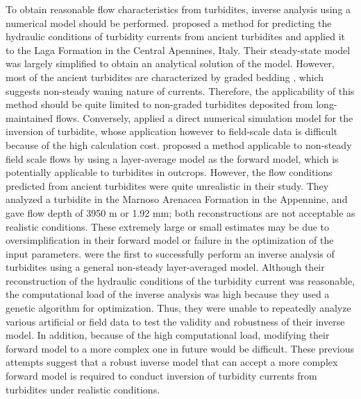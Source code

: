 To obtain reasonable flow characteristics from turbidites, inverse analysis using a numerical model should be performed. \citet{Falcini2009} proposed a method for predicting the hydraulic conditions of turbidity currents from ancient turbidites and applied it to the Laga Formation in the Central Apennines, Italy. Their steady-state model was largely simplified to obtain an analytical solution of the model. However, most of the ancient turbidites are characterized by graded bedding \citep{Bouma1962}, which suggests non-steady waning nature of currents. Therefore, the applicability of this method should be quite limited to non-graded turbidites deposited from long-maintained flows. Conversely, \citet{lesshafft2011towards} applied a direct numerical simulation model for the inversion of turbidite, whose application however to field-scale data is difficult because of the high calculation cost. \citet{Parkinson2017} proposed a method applicable to non-steady field scale flows by using a layer-average model as the forward model, which is potentially applicable to turbidites in outcrops. However, the flow conditions predicted from ancient turbidites were quite unrealistic in their study. They analyzed a turbidite in the Marnoso Arenacea Formation in the Appennine, and gave flow depth of  3950 m or 1.92 mm; both reconstructions are not acceptable as realistic conditions. These extremely large or small estimates may be due to oversimplification in their forward model or failure in the optimization of the input parameters. \citet{Nakao2017} were the first to successfully perform an inverse analysis of turbidites using a general non-steady layer-averaged model. Although their reconstruction of the hydraulic conditions of the turbidity current was reasonable, the computational load of the inverse analysis was high because they used a genetic algorithm for optimization. Thus, they were unable to repeatedly analyze various artificial or field data to test the validity and robustness of their inverse model. In addition, because of the high computational load, modifying their forward model to a more complex one in future would be difficult. These previous attempts suggest that a robust inverse model that can accept a more complex forward model is required to conduct inversion of turbidity currents from turbidites under realistic conditions.

